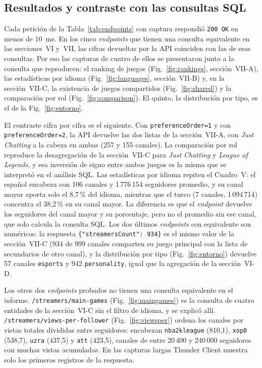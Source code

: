\documentclass[conference]{IEEEtran}
\begin{document}
\subsection{Resultados y contraste con las consultas SQL}
Cada petición de la Tabla~\ref{tab:endpoints} con captura respondió \texttt{200 OK} en menos de 10~ms. En los cinco \emph{endpoints} que tienen una consulta equivalente en las secciones~VI y~VII, las cifras devueltas por la API coinciden con las de esas consultas. Por eso las capturas de cuatro de ellos se presentaron junto a la consulta que reproducen: el ranking de juegos (Fig.~\ref{fig:rankings}, sección~VII-A), las estadísticas por idioma (Fig.~\ref{fig:languages}, sección~VII-B) y, en la sección~VII-C, la existencia de juegos compartidos (Fig.~\ref{fig:shared}) y la comparación por rol (Fig.~\ref{fig:comparison}). El quinto, la distribución por tipo, es el de la Fig.~\ref{fig:entorno}.

El contraste cifra por cifra es el siguiente. Con \texttt{preferenceOrder=1} y con \texttt{preferenceOrder=2}, la API devuelve las dos listas de la sección~VII-A, con \emph{Just Chatting} a la cabeza en ambas (257 y 155 canales). La comparación por rol reproduce la desagregación de la sección~VII-C para \emph{Just Chatting} y \emph{League of Legends}, y esa inversión de signo entre ambos juegos es la misma que se interpretó en el análisis SQL. Las estadísticas por idioma repiten el Cuadro~V: el español encabeza con 106 canales y 1\,776\,154 seguidores promedio, y su canal mayor aporta solo el 8,7\,\% del idioma, mientras que el turco (7 canales, 1\,094\,714) concentra el 38,2\,\% en su canal mayor. La diferencia es que el \emph{endpoint} devuelve los seguidores del canal mayor y su porcentaje, pero no el promedio sin ese canal, que solo calcula la consulta SQL. Los dos últimos \emph{endpoints} con equivalente son numéricos: la respuesta \texttt{\{"streamersCount": 934\}} es el mismo valor de la sección~VII-C (934 de 999 canales comparten su juego principal con la lista de secundarios de otro canal), y la distribución por tipo (Fig.~\ref{fig:entorno}) devuelve 57 canales \texttt{esports} y 942 \texttt{personality}, igual que la agregación de la sección~VI-D.

Los otros dos \emph{endpoints} probados no tienen una consulta equivalente en el informe. \texttt{/streamers/main-games} (Fig.~\ref{fig:maingames}) es la consulta de cuatro entidades de la sección~VI-C sin el filtro de idioma, y se explicó allí. \texttt{/streamers/views-per-follower} (Fig.~\ref{fig:viewsper}) ordena los canales por vistas totales divididas entre seguidores: encabezan \texttt{nba2kleague} (810,1), \texttt{xop0} (538,7), \texttt{uzra} (437,5) y \texttt{att} (423,5), canales de entre 20\,400 y 240\,000 seguidores con muchas vistas acumuladas. En las capturas largas Thunder Client muestra solo los primeros registros de la respuesta.
\end{document}
